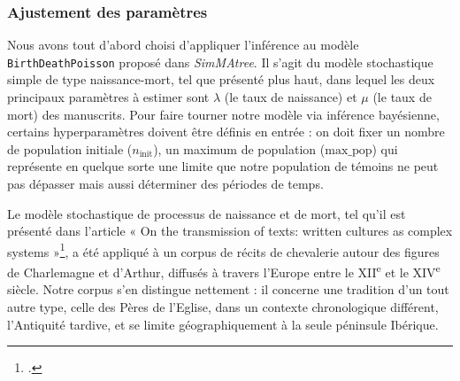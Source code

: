 \documentclass[a4paper,twoside,12pt]{book}
\begin{document}
\subsubsection{Ajustement des paramètres}

Nous avons tout d'abord choisi d’appliquer l’inférence au modèle \texttt{BirthDeathPoisson} proposé dans \textit{SimMAtree}. Il s’agit du modèle stochastique simple de type naissance-mort, tel que présenté plus haut, dans lequel les deux principaux paramètres à estimer sont $\lambda$ (le taux de naissance) et $\mu$ (le taux de mort) des manuscrits. Pour faire tourner notre modèle via inférence bayésienne, certains hyperparamètres doivent être définis en entrée : on doit fixer un nombre de population initiale ($n_{\text{init}}$), un maximum de population ($\text{max\_pop}$) qui représente en quelque sorte une limite que notre population de témoins ne peut pas dépasser mais aussi déterminer des périodes de temps.


Le modèle stochastique de processus de naissance et de mort, tel qu’il est présenté dans l’article « On the transmission of texts: written cultures as complex systems »\footcite{camps_transmission_2025}, a été appliqué à un corpus de récits de chevalerie autour des figures de Charlemagne et d’Arthur, diffusés à travers l’Europe entre le XII\textsuperscript{e} et le XIV\textsuperscript{e} siècle. Notre corpus s'en distingue nettement : il concerne une tradition d’un tout autre type, celle des Pères de l'Eglise, dans un contexte chronologique différent, l’Antiquité tardive, et se limite géographiquement à la seule péninsule Ibérique. 
\end{document}
